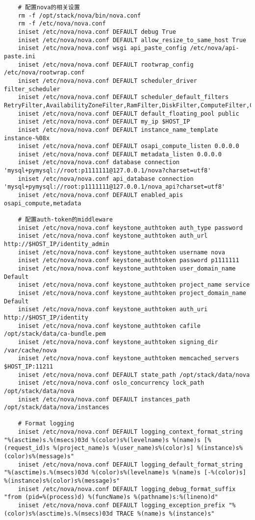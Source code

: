 \documentclass[a4paper,left=1.5cm,right=1.5cm,11pt]{article}
\begin{document}
\begin{lstlisting}
	# 配置nova的相关设置
	rm -f /opt/stack/nova/bin/nova.conf
	rm -f /etc/nova/nova.conf
	iniset /etc/nova/nova.conf DEFAULT debug True
    iniset /etc/nova/nova.conf DEFAULT allow_resize_to_same_host True
    iniset /etc/nova/nova.conf wsgi api_paste_config /etc/nova/api-paste.ini
    iniset /etc/nova/nova.conf DEFAULT rootwrap_config /etc/nova/rootwrap.conf
    iniset /etc/nova/nova.conf DEFAULT scheduler_driver filter_scheduler
    iniset /etc/nova/nova.conf DEFAULT scheduler_default_filters RetryFilter,AvailabilityZoneFilter,RamFilter,DiskFilter,ComputeFilter,ComputeCapabilitiesFilter,ImagePropertiesFilter,ServerGroupAntiAffinityFilter,ServerGroupAffinityFilter,SameHostFilter,DifferentHostFilter
    iniset /etc/nova/nova.conf DEFAULT default_floating_pool public
	iniset /etc/nova/nova.conf DEFAULT my_ip $HOST_IP
    iniset /etc/nova/nova.conf DEFAULT instance_name_template instance-%08x
    iniset /etc/nova/nova.conf DEFAULT osapi_compute_listen 0.0.0.0
    iniset /etc/nova/nova.conf DEFAULT metadata_listen 0.0.0.0
	iniset /etc/nova/nova.conf database connection 'mysql+pymysql://root:p1111111@127.0.0.1/nova?charset=utf8'
	iniset /etc/nova/nova.conf api_database connection 'mysql+pymysql://root:p1111111@127.0.0.1/nova_api?charset=utf8'
	iniset /etc/nova/nova.conf DEFAULT enabled_apis osapi_compute,metadata

	# 配置auth-token的middleware
	iniset /etc/nova/nova.conf keystone_authtoken auth_type password
    iniset /etc/nova/nova.conf keystone_authtoken auth_url http://$HOST_IP/identity_admin
    iniset /etc/nova/nova.conf keystone_authtoken username nova
    iniset /etc/nova/nova.conf keystone_authtoken password p1111111
    iniset /etc/nova/nova.conf keystone_authtoken user_domain_name Default
    iniset /etc/nova/nova.conf keystone_authtoken project_name service
    iniset /etc/nova/nova.conf keystone_authtoken project_domain_name Default
    iniset /etc/nova/nova.conf keystone_authtoken auth_uri http://$HOST_IP/identity
    iniset /etc/nova/nova.conf keystone_authtoken cafile /opt/stack/data/ca-bundle.pem
    iniset /etc/nova/nova.conf keystone_authtoken signing_dir /var/cache/nova
    iniset /etc/nova/nova.conf keystone_authtoken memcached_servers $HOST_IP:11211
	iniset /etc/nova/nova.conf DEFAULT state_path /opt/stack/data/nova
    iniset /etc/nova/nova.conf oslo_concurrency lock_path /opt/stack/data/nova
	iniset /etc/nova/nova.conf DEFAULT instances_path /opt/stack/data/nova/instances

	# Format logging
	iniset /etc/nova/nova.conf DEFAULT logging_context_format_string "%(asctime)s.%(msecs)03d %(color)s%(levelname)s %(name)s [%(request_id)s %(project_name)s %(user_name)s%(color)s] %(instance)s%(color)s%(message)s"
    iniset /etc/nova/nova.conf DEFAULT logging_default_format_string "%(asctime)s.%(msecs)03d %(color)s%(levelname)s %(name)s [-%(color)s] %(instance)s%(color)s%(message)s"
    iniset /etc/nova/nova.conf DEFAULT logging_debug_format_suffix "from (pid=%(process)d) %(funcName)s %(pathname)s:%(lineno)d"
    iniset /etc/nova/nova.conf DEFAULT logging_exception_prefix "%(color)s%(asctime)s.%(msecs)03d TRACE %(name)s %(instance)s"


\end{lstlisting}
\end{document}
